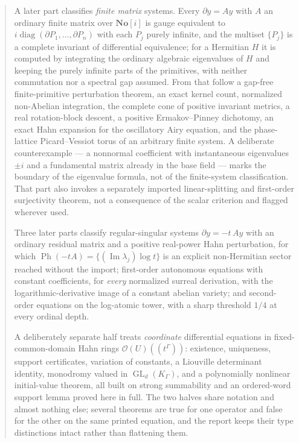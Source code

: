 \documentclass[11pt,letterpaper]{article}
\numberwithin{equation}{section}
\theoremstyle{definition}
\theoremstyle{remark}
\newcommand{\SC}{\mathbf{No}[i]}
\newcommand{\der}{\partial}
\newcommand{\Imm}{\operatorname{Im}}
\newcommand{\Hol}{\mathscr O}
\newcommand{\GL}{\operatorname{GL}}
\newcommand{\Ph}{\operatorname{Ph}}
\begin{document}
\begin{titlepage}
\begin{minipage}{0.93\textwidth}
\begin{abstract}
A later part classifies \emph{finite matrix} systems. Every $\der y=Ay$ with
$A$ an ordinary finite matrix over $\SC$ is gauge equivalent to
$i\operatorname{diag}(\der P_{1},\dots,\der P_{n})$ with each $P_{j}$ purely
infinite, and the multiset $\{P_{j}\}$ is a complete invariant of differential
equivalence; for a Hermitian $H$ it is computed by integrating the ordinary
algebraic eigenvalues of $H$ and keeping the purely infinite parts of the
primitives, with neither commutation nor a spectral gap assumed. From that
follow a gap-free finite-primitive perturbation theorem, an exact kernel
count, normalized non-Abelian integration, the complete cone of positive
invariant metrics, a real rotation-block descent, a positive Ermakov--Pinney
dichotomy, an exact Hahn expansion for the oscillatory Airy equation, and the
phase-lattice Picard--Vessiot torus of an arbitrary finite system. A
deliberate counterexample --- a nonnormal coefficient with instantaneous
eigenvalues $\pm i$ and a fundamental matrix already in the base field ---
marks the boundary of the eigenvalue formula, not of the finite-system classification. That part also
invokes a separately imported linear-splitting and first-order surjectivity
theorem, not a consequence of the scalar criterion and flagged wherever used.

Three later parts classify regular-singular systems $\der y=-t\,Ay$ with an
ordinary residual matrix and a positive real-power Hahn perturbation, for which
$\Ph(-tA)=\{(\Imm\lambda_{j})\log t\}$ is an explicit non-Hermitian sector reached
without the import; first-order autonomous equations with constant
coefficients, for \emph{every} normalized surreal derivation, with the
logarithmic-derivative image of a constant abelian variety; and second-order
equations on the log-atomic tower, with a sharp threshold $1/4$ at every
ordinal depth.

A deliberately separate half treats \emph{coordinate} differential equations
in fixed-common-domain Hahn rings $\Hol(U)((t^{\Gamma}))$: existence,
uniqueness, support certificates, variation of constants, a Liouville
determinant identity, monodromy valued in $\GL_{d}(K_{\Gamma})$, and a
polynomially nonlinear initial-value theorem, all built on strong summability
and an ordered-word support lemma proved here in full. The two halves share
notation and almost nothing else; several theorems are true for one operator
and false for the other on the same printed equation, and the report keeps
their type distinctions intact rather than flattening them.


\end{abstract}
\end{minipage}
\end{titlepage}
\end{document}
